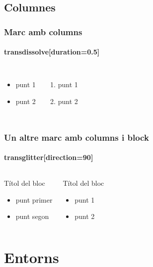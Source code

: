 \documentclass{beamer}
\begin{document}
\subsection{Columnes}
\begin{frame}
  \frametitle{Marc amb columns}
  \framesubtitle{transdissolve[duration=0.5]}
  \begin{columns}
			  \begin{itemize}
				\item punt 1
				\item punt 2
			  \end{itemize}
			  \begin{enumerate}
				\item punt 1
				\item punt 2
			  \end{enumerate}
  \end{columns} 
  \transdissolve[duration=0.5]
  
\end{frame}
\begin{frame}
  \frametitle{Un altre marc amb columns i block}
  \framesubtitle{transglitter[direction=90]}
  \begin{columns}
			    \begin{block}{Títol del bloc}
				\begin{itemize}
					\item punt primer
					\item punt segon
				\end{itemize}
\end{block}
			    \begin{block}{Títol del bloc}
				\begin{itemize}
					\item punt 1
					\item punt 2
				\end{itemize}
\end{block}
  \end{columns} 
  \transglitter[direction=90]
  

\end{frame}
\section{Entorns}
\end{document}
